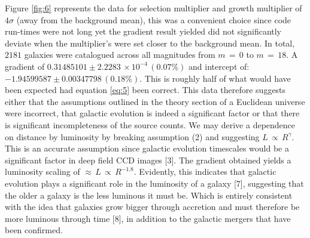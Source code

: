\documentclass[journal]{IEEEtran}
\begin{document}
Figure \ref{fig:6} represents the data for selection multiplier and growth multiplier of $4\sigma$ (away from the background mean), this was a convenient choice since code run-times were not long yet the gradient result yielded did not significantly deviate when the multiplier's were set closer to the background mean. In total, $2181$ galaxies were catalogued across all magnitudes from $m\,=\,0$ to $m\,=\,18$. A gradient of $0.31485101 \pm 2.2283\,\times10^{-4}\, (0.07\%)$ and  intercept of: $-1.94599587 \pm 0.00347798\, (0.18\%)$. This is roughly half of what would have been expected had equation \ref{eq:5} been correct. This data therefore suggests either that the assumptions outlined in the theory section of a Euclidean universe were incorrect, that galactic evolution is indeed a significant factor or that there is significant incompleteness of the source counts. We may derive a dependence on distance by luminosity by breaking assumption (2) and suggesting $L\,\propto\,R^\gamma$. This is an accurate assumption since galactic evolution timescales would be a significant factor in deep field CCD images [3]. The gradient obtained yields a luminosity scaling of $\approx\,L\,\propto\,R^{-1.8}$. Evidently, this indicates that galactic evolution plays a significant role in the luminosity of a galaxy [7], suggesting that the older a galaxy is the less luminous it must be. Which is entirely consistent with the idea that galaxies grow bigger through accretion and must therefore be more luminous through time [8], in addition to the galactic mergers that have been confirmed.\newline
\end{document}
